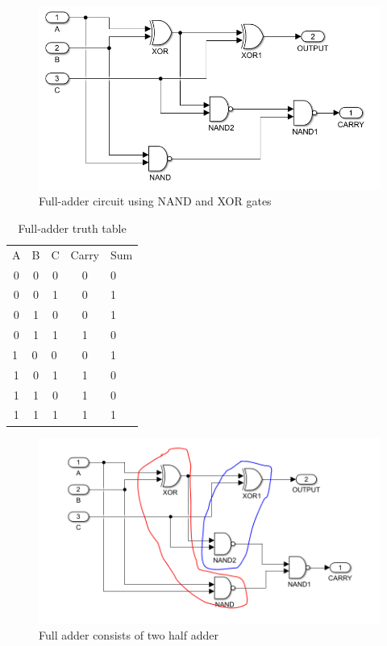 \documentclass[11pt]{report}
\begin{document}
\begin{figure}[H]
  \includegraphics[width=\linewidth]{fulladder}
  \caption{Full-adder circuit using NAND and XOR gates}
  \label{fig:zero}
\end{figure}
\begin{table}[H]
\centering
\caption{Full-adder truth table}
\label{my-label}
\begin{tabular}{ccccl}
A                     & B                     & C                     & Carry & Sum \\
0                     & 0                     & 0                     & 0     & 0   \\
0                     & 0                     & 1                     & 0     & 1   \\
0                     & 1                     & 0                     & 0     & 1   \\
0                     & 1                     & 1                     & 1     & 0   \\
\multicolumn{1}{l}{1} & \multicolumn{1}{l}{0} & \multicolumn{1}{l}{0} & 0     & 1   \\
1                     & 0                     & 1                     & 1     & 0   \\
1                     & 1                     & 0                     & 1     & 0   \\
1                     & 1                     & 1                     & 1     & 1  
\end{tabular}
\end{table}
\begin{figure}[H]
  \includegraphics[width=\linewidth]{fulladder1}
  \caption{Full adder consists of two half adder}
  \label{fig:zero}
\end{figure}
\end{document}
